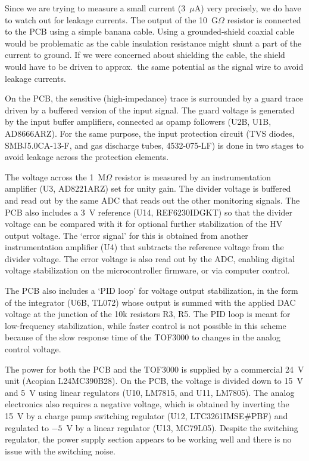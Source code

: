 Since we are trying to measure a small current (3~$\mu$A) very precisely, we do
have to watch out for leakage currents. The output of the 10~G$\Omega$ resistor
is connected to the PCB using a simple banana cable. Using a grounded-shield
coaxial cable would be problematic as the cable insulation resistance might
shunt a part of the current to ground. If we were concerned about shielding the
cable, the shield would have to be driven to approx.\ the same potential as the
signal wire to avoid leakage currents.

On the PCB, the sensitive (high-impedance) trace is surrounded by a guard trace
driven by a buffered version of the input signal. The guard voltage is generated
by the input buffer amplifiers, connected as opamp followers (U2B, U1B,
AD8666ARZ). For the same purpose, the input protection circuit (TVS diodes,
SMBJ5.0CA-13-F, and gas discharge tubes, 4532-075-LF) is done in two stages to
avoid leakage across the protection elements.

The voltage across the 1~M$\Omega$ resistor is measured by an instrumentation
amplifier (U3, AD8221ARZ) set for unity gain. The divider voltage is buffered
and read out by the same ADC that reads out the other monitoring signals. The
PCB also includes a 3~V reference (U14, REF6230IDGKT) so that the divider
voltage can be compared with it for optional further stabilization of the HV
output voltage. The `error signal' for this is obtained from another
instrumentation amplifier (U4) that subtracts the reference voltage from the
divider voltage. The error voltage is also read out by the ADC, enabling digital
voltage stabilization on the microcontroller firmware, or via computer control.

The PCB also includes a `PID loop' for voltage output stabilization, in the form
of the integrator (U6B, TL072) whose output is summed with the applied DAC
voltage at the junction of the 10k resistors R3, R5. The PID loop is meant for
low-frequency stabilization, while faster control is not possible in this scheme
because of the slow response time of the TOF3000 to changes in the analog
control voltage.

The power for both the PCB and the TOF3000 is supplied by a commercial 24~V unit
(Acopian L24MC390B28). On the PCB, the voltage is divided down to 15~V and 5~V
using linear regulators (U10, LM7815, and U11, LM7805). The analog electronics
also requires a negative voltage, which is obtained by inverting the 15~V by a
charge pump switching regulator (U12, LTC3261IMSE\#PBF) and regulated to $-5$~V
by a linear regulator (U13, MC79L05). Despite the switching regulator, the power
supply section appears to be working well and there is no issue with the
switching noise.
